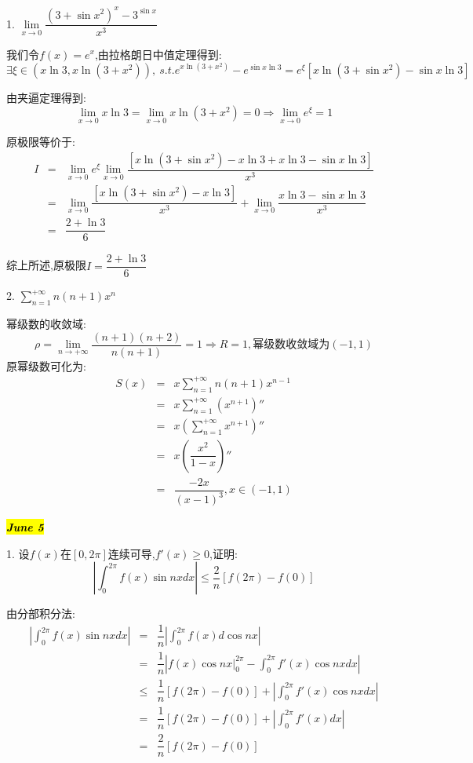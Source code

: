 1. $\lim\limits_{x\rightarrow 0}\dfrac{(3+\sin x^2)^{x}-3^{\sin x}}{x^3}$
\begin{solution}
	
	我们令$f(x)=e^x$,由拉格朗日中值定理得到: 
	$$\exists \xi\in(x\ln 3,x\ln(3+x^2)),\ s.t. e^{x\ln(3+x^2)}-e^{\sin x\ln 3}=e^{\xi}[x\ln(3+\sin x^2)-\sin x\ln 3]$$
	
	由夹逼定理得到: 
	$$\lim\limits_{x\rightarrow 0 }x\ln 3=\lim\limits_{x\rightarrow 0 }x\ln(3+x^2)=0\Rightarrow \lim\limits_{x\rightarrow 0 }e^{\xi}=1$$
	
	原极限等价于: 
	\begin{eqnarray*}
		I&=&\lim\limits_{x\rightarrow 0}e^{\xi}\lim\limits_{x\rightarrow 0}\dfrac{[x\ln(3+\sin x^2)-x\ln 3+x\ln 3-\sin x\ln 3]}{x^3}\\
		&=&\lim\limits_{x\rightarrow 0}\dfrac{[x\ln(3+\sin x^2)-x\ln 3]}{x^3}+\lim\limits_{x\rightarrow 0}\dfrac{x\ln 3-\sin x\ln 3}{x^3}\\
		&=&\dfrac{2+\ln 3}{6}
	\end{eqnarray*}
	
	综上所述,原极限$I=\dfrac{2+\ln 3}{6}$
\end{solution}

2. $\sum\limits_{n=1}^{+\infty}n(n+1)x^n$
\begin{solution}
	
	幂级数的收敛域: 
	$$\rho=\lim\limits_{n\rightarrow+\infty}\dfrac{(n+1)(n+2)}{n(n+1)}=1\Rightarrow R=1,\text{幂级数收敛域为}(-1,1)$$
	原幂级数可化为: 
	\begin{eqnarray*}
		S(x)&=&x\sum\limits_{n=1}^{+\infty}n(n+1)x^{n-1}\\&=&x\sum\limits_{n=1}^{+\infty}(x^{n+1})''\\&=&x\left( \sum\limits_{n=1}^{+\infty}x^{n+1}\right) ''\\
		&=&x\left( \dfrac{x^2}{1-x}\right) ''\\
		&=&\dfrac{-2x}{(x-1)^3},x\in(-1,1)
	\end{eqnarray*}
\end{solution}

\hl{\textbf{\textit{June 5}}}

1. 设$f(x)$在$[0,2\pi]$连续可导,$f'(x)\geq 0$,证明: 
$$\left| \int_{0}^{2\pi}f(x)\sin nxdx\right|\leq \dfrac{2}{n}[f(2\pi)-f(0)] $$
\begin{solution}
	
	由分部积分法: 
	\begin{eqnarray*}
		\left| \int_{0}^{2\pi}f(x)\sin nxdx\right|&=&\dfrac{1}{n}\left| \int_{0}^{2\pi}f(x)d\cos nx\right|\\
		&=&\dfrac{1}{n}\left| f(x)\cos nx|_{0}^{2\pi}-\int_{0}^{2\pi}f'(x)\cos nxdx\right|\\
		&\leq &\dfrac{1}{n}[f(2\pi)-f(0)]+|\int_{0}^{2\pi}f'(x)\cos nxdx|\\
		&=&\dfrac{1}{n}[f(2\pi)-f(0)]+|\int_{0}^{2\pi}f'(x)dx|\\
		&=&\dfrac{2}{n}[f(2\pi)-f(0)]
	\end{eqnarray*}
\end{solution}

